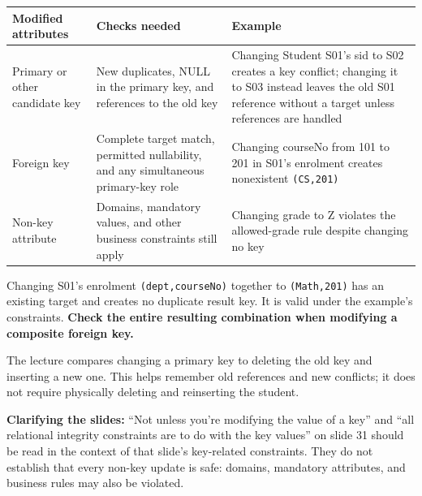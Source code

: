 \begin{longtable}[]{@{}
  >{\raggedright\arraybackslash}p{}
  >{\raggedright\arraybackslash}p{}
  >{\raggedright\arraybackslash}p{}@{}}
\toprule\noalign{}
\begin{minipage}[b]{\linewidth}\raggedright
Modified attributes
\end{minipage} & \begin{minipage}[b]{\linewidth}\raggedright
Checks needed
\end{minipage} & \begin{minipage}[b]{\linewidth}\raggedright
Example
\end{minipage} \\
\midrule\noalign{}
\endhead
\bottomrule\noalign{}
\endlastfoot
Primary or other candidate key & New duplicates, NULL in the primary key, and references to the old key & Changing Student S01's sid to S02 creates a key conflict; changing it to S03 instead leaves the old S01 reference without a target unless references are handled \\
Foreign key & Complete target match, permitted nullability, and any simultaneous primary-key role & Changing courseNo from 101 to 201 in S01's enrolment creates nonexistent \texttt{(\allowbreak{}CS,\allowbreak{}201)\allowbreak{}} \\
Non-key attribute & Domains, mandatory values, and other business constraints still apply & Changing grade to Z violates the allowed-grade rule despite changing no key \\
\end{longtable}

Changing S01's enrolment \texttt{(\allowbreak{}dept,\allowbreak{}courseNo)\allowbreak{}} together to \texttt{(\allowbreak{}Math,\allowbreak{}201)\allowbreak{}} has an existing target and creates no duplicate result key. It is valid under the example's constraints. \textbf{Check the entire resulting combination when modifying a composite foreign key.}

The lecture compares changing a primary key to deleting the old key and inserting a new one. This helps remember old references and new conflicts; it does not require physically deleting and reinserting the student.

\textbf{Clarifying the slides:} ``Not unless you're modifying the value of a key'' and ``all relational integrity constraints are to do with the key values'' on slide 31 should be read in the context of that slide's key-related constraints. They do not establish that every non-key update is safe: domains, mandatory attributes, and business rules may also be violated.

